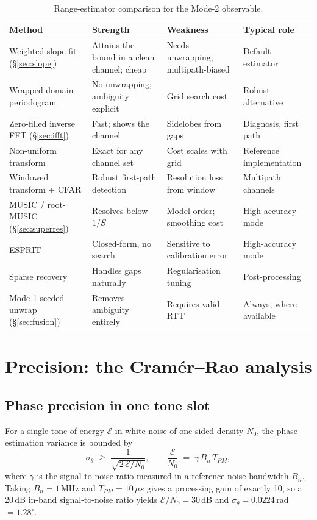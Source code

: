 \documentclass[11pt,a4paper]{article}
\newcommand{\us}{\,\ensuremath{\upmu}s}
\newcommand{\Tpm}{T_{PM}}
\providecommand{\upmu}{\mu}
\begin{document}
\begin{table}[htb]
\caption{Range-estimator comparison for the Mode-2 observable.}
\label{tab:estcmp}
\centering\small
\begin{tabular}{@{}L{33mm}L{30mm}L{31mm}L{26mm}@{}}
\toprule
Method & Strength & Weakness & Typical role \\
\midrule
Weighted slope fit (\S\ref{sec:slope}) & Attains the bound in a clean channel; cheap & Needs unwrapping; multipath-biased & Default estimator \\
Wrapped-domain periodogram & No unwrapping; ambiguity explicit & Grid search cost & Robust alternative \\
Zero-filled inverse FFT (\S\ref{sec:ifft}) & Fast; shows the channel & Sidelobes from gaps & Diagnosis, first path \\
Non-uniform transform & Exact for any channel set & Cost scales with grid & Reference implementation \\
Windowed transform + CFAR & Robust first-path detection & Resolution loss from window & Multipath channels \\
MUSIC / root-MUSIC (\S\ref{sec:superres}) & Resolves below $1/S$ & Model order; smoothing cost & High-accuracy mode \\
ESPRIT & Closed-form, no search & Sensitive to calibration error & High-accuracy mode \\
Sparse recovery & Handles gaps naturally & Regularisation tuning & Post-processing \\
Mode-1-seeded unwrap (\S\ref{sec:fusion}) & Removes ambiguity entirely & Requires valid RTT & Always, where available \\
\bottomrule
\end{tabular}
\end{table}

\section{Precision: the Cram\'er--Rao analysis}
\label{sec:crlb}

\subsection{Phase precision in one tone slot}

For a single tone of energy $\mathcal{E}$ in white noise of one-sided density $N_0$, the phase
estimation variance is bounded by
\begin{equation}
\sigma_\theta \;\ge\; \frac{1}{\sqrt{2\,\mathcal{E}/N_0}},
\qquad
\frac{\mathcal{E}}{N_0} \;=\; \gamma\, B_n\, \Tpm ,
\label{eq:phasecrlb}
\end{equation}
where $\gamma$ is the signal-to-noise ratio measured in a reference noise bandwidth $B_n$. Taking
$B_n = 1$\,MHz and $\Tpm = 10\us$ gives a processing gain of exactly 10, so a 20\,dB in-band
signal-to-noise ratio yields $\mathcal{E}/N_0 = 30$\,dB and
$\sigma_\theta = 0.0224$\,rad $=1.28^{\circ}$.
\end{document}
